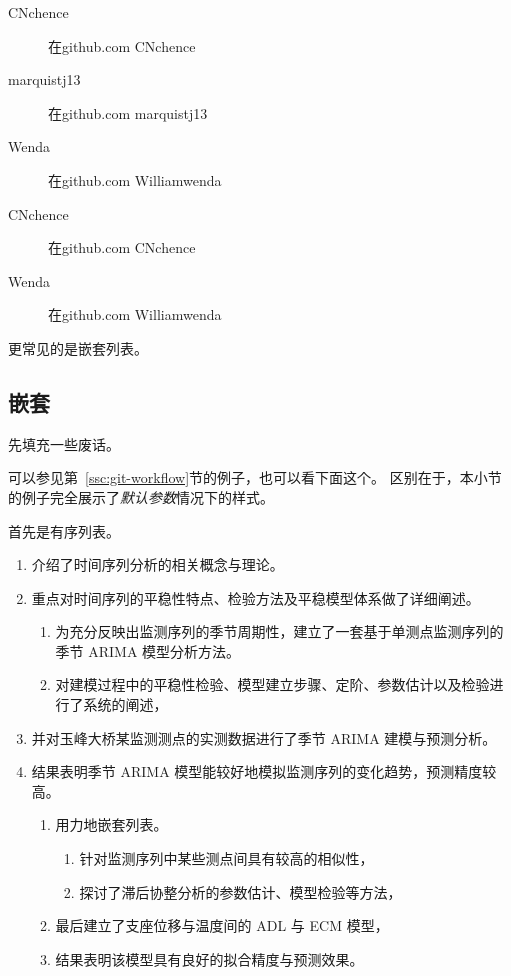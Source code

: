 \documentclass[../Main/thesis]{subfiles}
\begin{document}
\begin{description}
  \item[CNchence] 在github.com CNchence
  \item[marquistj13] 在github.com marquistj13
  \item[Wenda] 在github.com Williamwenda
  \item[CNchence] 在github.com CNchence
  \item[Wenda] 在github.com Williamwenda
\end{description}

更常见的是嵌套列表。

\subsection{嵌套}

先填充一些废话。\zhlipsum[6]

可以参见第~\ref{ssc:git-workflow}节的例子，也可以看下面这个。
区别在于，本小节的例子完全展示了\emph{默认参数}情况下的样式。

首先是有序列表。
\begin{enumerate}
  \item 介绍了时间序列分析的相关概念与理论。
  \item 重点对时间序列的平稳性特点、检验方法及平稳模型体系做了详细阐述。
  \begin{enumerate}
    \item 为充分反映出监测序列的季节周期性，建立了一套基于单测点监测序列的季节 ARIMA 模型分析方法。
    \item 对建模过程中的平稳性检验、模型建立步骤、定阶、参数估计以及检验进行了系统的阐述，
  \end{enumerate}
  \item 并对玉峰大桥某监测测点的实测数据进行了季节 ARIMA 建模与预测分析。
  \item 结果表明季节 ARIMA 模型能较好地模拟监测序列的变化趋势，预测精度较高。
  \begin{enumerate}
    \item 用力地嵌套列表。
    \begin{enumerate}
      \item 针对监测序列中某些测点间具有较高的相似性，
      \item 探讨了滞后协整分析的参数估计、模型检验等方法，
    \end{enumerate}
    \item 最后建立了支座位移与温度间的 ADL 与 ECM 模型，
    \item 结果表明该模型具有良好的拟合精度与预测效果。
  \end{enumerate}
\end{enumerate}
\end{document}
